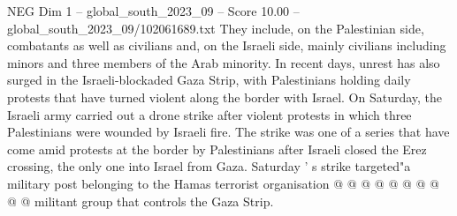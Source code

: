 \begin{textsample}{NEG Dim 1 – global\_south\_2023\_09 – Score 10.00 – global\_south\_2023\_09/102061689.txt}
They include, on the Palestinian side, combatants as well as civilians and, on the Israeli side, mainly civilians including minors and three members of the Arab minority.
In recent days, unrest has also surged in the Israeli-blockaded Gaza Strip, with Palestinians holding daily protests that have turned violent along the border with Israel.
On Saturday, the Israeli army carried out a drone strike after violent protests in which three Palestinians were wounded by Israeli fire.
The strike was one of a series that have come amid protests at the border by Palestinians after Israeli closed the Erez crossing, the only one into Israel from Gaza.
Saturday ' s strike targeted"a military post belonging to the Hamas terrorist organisation @ @ @ @ @ @ @ @ @ @ militant group that controls the Gaza Strip.

\end{textsample}
